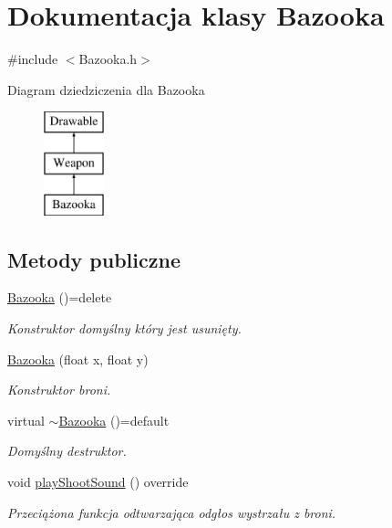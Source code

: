 \hypertarget{class_bazooka}{}\section{Dokumentacja klasy Bazooka}
\label{class_bazooka}


{\ttfamily \#include $<$Bazooka.\+h$>$}

Diagram dziedziczenia dla Bazooka\begin{figure}[H]
\begin{center}
\leavevmode
\includegraphics[height=3.000000cm]{class_bazooka}
\end{center}
\end{figure}
\subsection*{Metody publiczne}
\begin{DoxyCompactItemize}
\item 
\mbox{\hyperlink{class_bazooka_ab95ef6e55a5d1a7748df7287b562002b}{Bazooka}} ()=delete
\begin{DoxyCompactList}\small\item\em Konstruktor domyślny który jest usunięty. \end{DoxyCompactList}\item 
\mbox{\hyperlink{class_bazooka_aa3a6371f52b0649a6789401b8a11e8bd}{Bazooka}} (float x, float y)
\begin{DoxyCompactList}\small\item\em Konstruktor broni. \end{DoxyCompactList}\item 
virtual \mbox{\hyperlink{class_bazooka_a25ec2ef6a925a3b13947ad877d2ac823}{$\sim$\+Bazooka}} ()=default
\begin{DoxyCompactList}\small\item\em Domyślny destruktor. \end{DoxyCompactList}\item 
void \mbox{\hyperlink{class_bazooka_a2645b8043766ec5045e82d452828acdd}{play\+Shoot\+Sound}} () override
\begin{DoxyCompactList}\small\item\em Przeciążona funkcja odtwarzająca odgłos wystrzału z broni. \end{DoxyCompactList}\end{DoxyCompactItemize}
